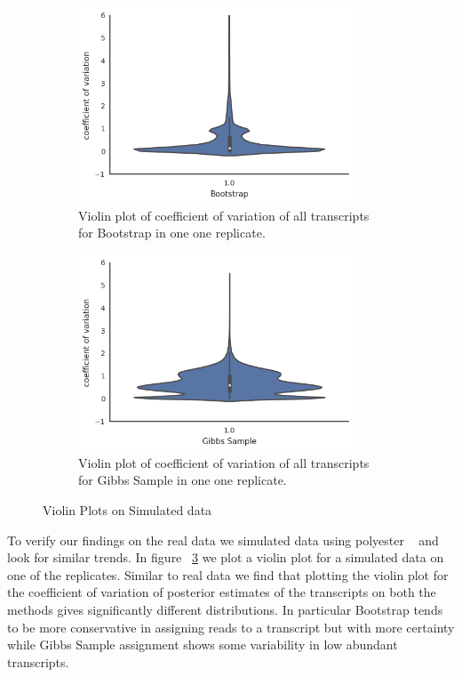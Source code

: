 \documentclass{article}
\begin{document}
\begin{figure}
  \centering
  \begin{subfigure}[t]{0.46\textwidth}
    \centering
    \includegraphics[width=0.9\textwidth]{figures/bootViolin.png}
    \caption{ \label{fig:bootViolin} Violin plot of coefficient of variation of all transcripts for Bootstrap in one one replicate. }
  \end{subfigure}
  \qquad
  \begin{subfigure}[t]{0.46\textwidth}
    \centering
      \includegraphics[width=0.9\textwidth]{figures/gibbsViolin.png}
      \caption{\label{fig:gibbsViolin} Violin plot of coefficient of variation of all transcripts for Gibbs Sample in one one replicate. }
  \end{subfigure}
  \caption{\label{fig:violin}Violin Plots on Simulated data}
\end{figure}


To verify our findings on the real data we simulated data using polyester ~\citep{Frazee2015Polyester} and look for similar trends. In figure 
~\cref{fig:violin} we plot a violin plot for a simulated data on one of the replicates. Similar to real data we find that
plotting the violin plot for the coefficient of variation of posterior estimates of the transcripts on both the methods
gives significantly different distributions. In particular Bootstrap tends to be more conservative in assigning reads to
a transcript but with more certainty while Gibbs Sample assignment shows some variability in low abundant transcripts.
\end{document}
